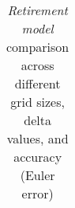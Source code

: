 \begin{table}[htbp]
\begin{tabular}{ccccccc|cccc}
        \bottomrule
        \end{tabular}
        \caption{\textit{Retirement model} comparison across different grid sizes, 
        delta values, and accuracy (Euler error)}
        \label{tab:timing_comparison}
        \end{table}
        